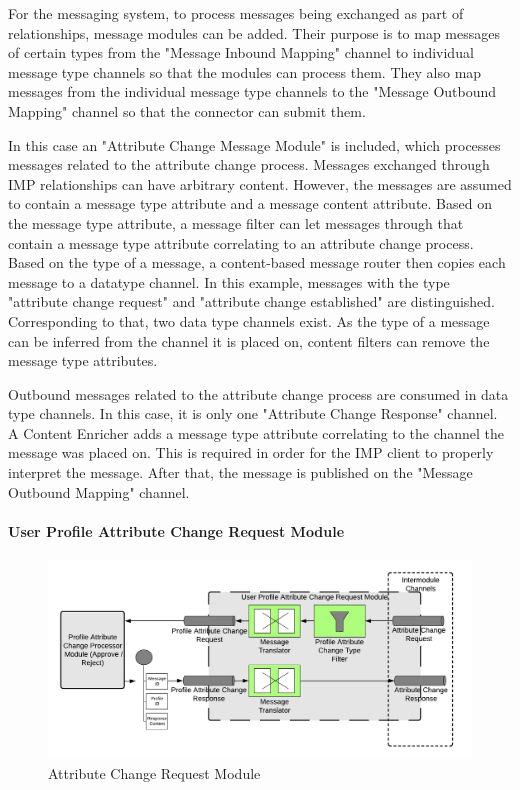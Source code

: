 For the messaging system, to process messages being exchanged as part of relationships, message modules can be added. Their purpose is to map messages of certain types from the "Message Inbound Mapping" channel to individual message type channels so that the modules can process them. They also map messages from the individual message type channels to the "Message Outbound Mapping" channel so that the connector can submit them.

In this case an "Attribute Change Message Module" is included, which processes messages related to the attribute change process. Messages exchanged through IMP relationships can have arbitrary content. However, the messages are assumed to contain a message type attribute and a message content attribute. Based on the message type attribute, a message filter can let messages through that contain a message type attribute correlating to an attribute change process. Based on the type of a message, a content-based message router then copies each message to a datatype channel. In this example, messages with the type "attribute change request" and "attribute change established" are distinguished. Corresponding to that, two data type channels exist. As the type of a message can be inferred from the channel it is placed on, content filters can remove the message type attributes.

Outbound messages related to the attribute change process are consumed in data type channels. In this case, it is only one "Attribute Change Response" channel. A Content Enricher adds a message type attribute correlating to the channel the message was placed on. This is required in order for the IMP client to properly interpret the message. After that, the message is published on the "Message Outbound Mapping" channel.

\paragraph{User Profile Attribute Change Request Module}

\begin{figure}[h!]
    \centering
    \includegraphics[scale=0.6]{Diagrams/Integration Architecture 1/Technological Integration/12. Attribute Change Request Module.pdf}
    \caption{Attribute Change Request Module}
    \label{integration1:attribute_change_request_module}
\end{figure}

